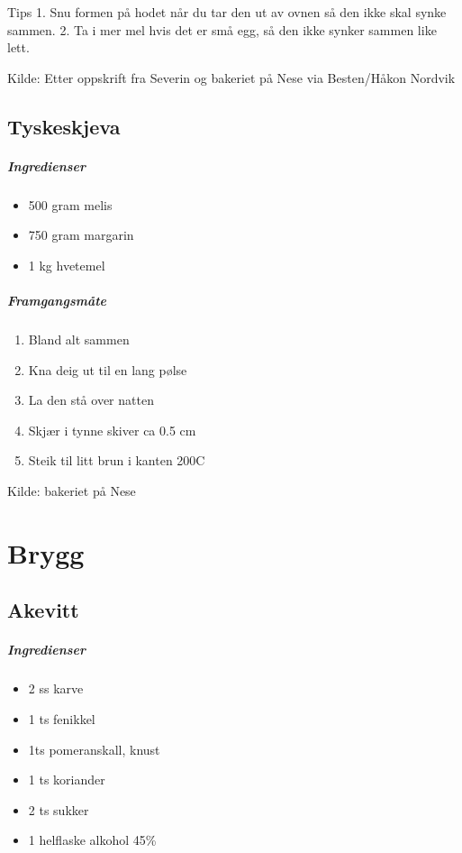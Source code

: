 \documentclass[12pt,a4paper]{book}
\begin{document}
{Tips
1. Snu formen på hodet når du tar den ut av ovnen så den ikke skal synke sammen.
2. Ta i mer mel hvis det er små egg, så den ikke synker sammen like lett.

Kilde: Etter oppskrift fra Severin og bakeriet på Nese via Besten/Håkon Nordvik
\clearpage{}
\clearpage{}\section{﻿Tyskeskjeva}


\paragraph{Ingredienser}
\begin{itemize}[noitemsep]
	\item 500 gram melis
	\item 750 gram margarin
	\item 1 kg hvetemel
\end{itemize}

\paragraph{Framgangsmåte}
\begin{enumerate}[noitemsep]
	\item Bland alt sammen
	\item Kna deig ut til en lang pølse
	\item La den stå over natten
	\item Skjær i tynne skiver ca 0.5 cm
	\item Steik til litt brun i kanten 200\degree C
\end{enumerate}

Kilde: bakeriet på Nese
\clearpage{}
 
\chapter{Brygg}
\clearpage{}\section{﻿Akevitt}
\label{akevitt}


\paragraph{Ingredienser}
\begin{itemize}[noitemsep]
	\item 2 ss karve
	\item 1 ts fenikkel
	\item 1ts pomeranskall, knust
	\item 1 ts koriander
	\item 2 ts sukker
	\item 1 helflaske alkohol 45\%
\end{itemize}

}
\end{document}
